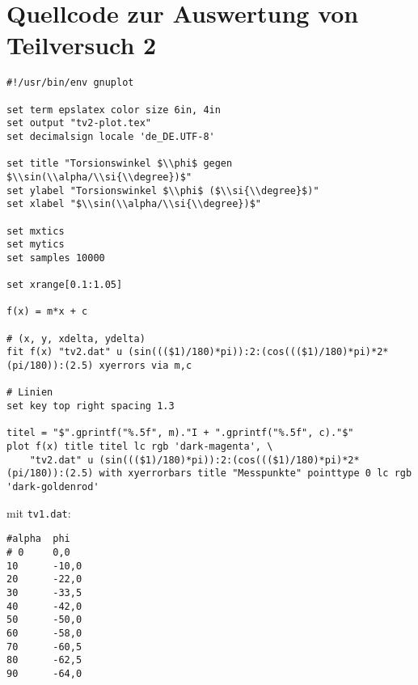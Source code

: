 \section{\gnuplot{} Quellcode zur Auswertung von Teilversuch 2}
    \label{appdx:gnuplottv2}
    {  
        \renewcommand{\fcolorbox}[4][]{#4}
        \begin{verbatim}
#!/usr/bin/env gnuplot

set term epslatex color size 6in, 4in
set output "tv2-plot.tex"
set decimalsign locale 'de_DE.UTF-8'

set title "Torsionswinkel $\\phi$ gegen $\\sin(\\alpha/\\si{\\degree})$"
set ylabel "Torsionswinkel $\\phi$ ($\\si{\\degree}$)"
set xlabel "$\\sin(\\alpha/\\si{\\degree})$"

set mxtics
set mytics
set samples 10000

set xrange[0.1:1.05]

f(x) = m*x + c

# (x, y, xdelta, ydelta)
fit f(x) "tv2.dat" u (sin((($1)/180)*pi)):2:(cos((($1)/180)*pi)*2*(pi/180)):(2.5) xyerrors via m,c

# Linien
set key top right spacing 1.3

titel = "$".gprintf("%.5f", m)."I + ".gprintf("%.5f", c)."$"
plot f(x) title titel lc rgb 'dark-magenta', \
    "tv2.dat" u (sin((($1)/180)*pi)):2:(cos((($1)/180)*pi)*2*(pi/180)):(2.5) with xyerrorbars title "Messpunkte" pointtype 0 lc rgb 'dark-goldenrod'
        \end{verbatim}
    }
    mit \texttt{tv1.dat}:
    \begin{multicols}{2}
        \begin{verbatim}
#alpha  phi
# 0     0,0
10      -10,0
20      -22,0
30      -33,5
40      -42,0
50      -50,0
60      -58,0
70      -60,5
80      -62,5
90      -64,0
        \end{verbatim}
    \end{multicols}
